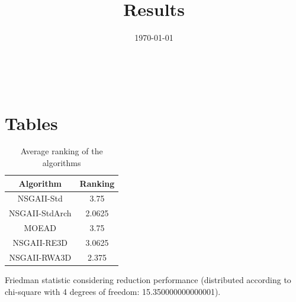\documentclass{article}
\title{Results}
\author{}
\date{\today}
\begin{document}
\oddsidemargin 0in \topmargin 0in\maketitle
\
\section{Tables}
\begin{table}[!htp]
\centering
\caption{Average ranking of the algorithms}
\begin{tabular}{c|c}
Algorithm&Ranking\\
\hline
NSGAII-Std&3.75\\
NSGAII-StdArch&2.0625\\
MOEAD&3.75\\
NSGAII-RE3D&3.0625\\
NSGAII-RWA3D&2.375\\
\end{tabular}
\end{table}


Friedman statistic considering reduction performance (distributed according to chi-square with 4 degrees of freedom: 15.350000000000001).
\end{document}
